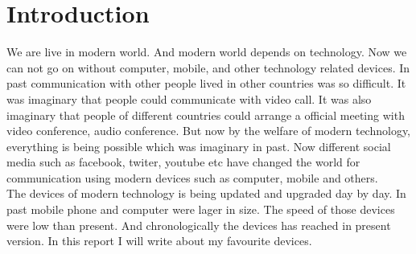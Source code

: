 \section{Introduction}
We are live in modern world. And modern world depends on technology. Now we can not go on without computer, mobile, and other technology related devices. In past communication with other people lived in other countries was so difficult. It was imaginary that people could communicate with video call. It was also imaginary that people of different countries could arrange a official meeting with video conference, audio conference. But now by the welfare of modern technology, everything is being possible which was imaginary in past. Now different social media such as facebook, twiter, youtube etc have changed the world for communication using modern devices such as computer, mobile and others. \\
The devices of modern technology is being updated and upgraded day by day. In past mobile phone and computer were lager in size. The speed of those devices were low than present. And chronologically the devices has reached in present version. In this report I will write about my favourite devices.


